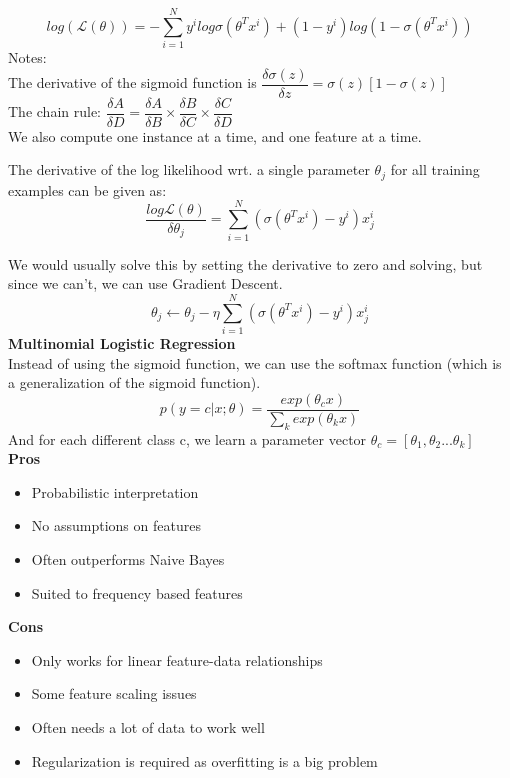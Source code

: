 \documentclass[a4paper,10pt]{article}
\begin{document}
\begin{equation*}
	log(\mathcal{L}(\theta)) = - \sum_{i=1}^{N}y^{i}log \sigma (\theta^{T}x^{i}) + (1 - y^{i}) log(1 - \sigma(\theta^{T}x^{i}))
\end{equation*}
Notes: \\
The derivative of the sigmoid function is $\dfrac{\delta \sigma (z)}{\delta z} = \sigma(z)[1 - \sigma(z)]$ \\
The chain rule: $\dfrac{\delta A}{\delta D} = \dfrac{\delta A}{\delta B} \times \dfrac{\delta B}{\delta C} \times \dfrac{\delta C}{\delta D}$ \\
We also compute one instance at a time, and one feature at a time. 
\begin{shaded}
	\noindent The derivative of the log likelihood wrt. a single parameter $\theta_{j}$ for all training examples can be given as: 
	\begin{equation*}
		\dfrac{log \mathcal{L}(\theta)}{\delta \theta_{j}} = \sum_{i=1}^{N}(\sigma(\theta^{T}x^{i}) - y^{i})x_{j}^{i}
	\end{equation*}
\end{shaded}
\noindent We would usually solve this by setting the derivative to zero and solving, but since we can't, we can use Gradient Descent. \\
\begin{equation*}
	\theta_{j} \leftarrow \theta_{j} - \eta \sum_{i = 1}^{N}(\sigma(\theta^{T}x^{i}) - y^{i})x_{j}^{i}
\end{equation*}
\textcolor{Periwinkle}{\textbf{Multinomial Logistic Regression}}\\
Instead of using the sigmoid function, we can use the softmax function (which is a generalization of the sigmoid function). 
\begin{equation*}
	p(y=c|x;\theta) = \dfrac{exp(\theta_{c}x)}{\sum_{k}exp(\theta_{k}x)}
\end{equation*}
And for each different class c, we learn a parameter vector $\theta_{c} = [\theta_{1}, \theta_{2} ... \theta_{k}]$\\
\textcolor{Periwinkle}{\textbf{Pros}}
\begin{itemize}
	\item Probabilistic interpretation 
	\item No assumptions on features 
	\item Often outperforms Naive Bayes 
	\item Suited to frequency based features 
\end{itemize}
\textcolor{Periwinkle}{\textbf{Cons}}
\begin{itemize}
	\item Only works for linear feature-data relationships 
	\item Some feature scaling issues 
	\item Often needs a lot of data to work well 
	\item Regularization is required as overfitting is a big problem 
\end{itemize}
\textcolor{Periwinkle}{\textbf{}}\\
\textcolor{Periwinkle}{\textbf{}}\\
\textcolor{Periwinkle}{\textbf{}}\\
\end{document}
